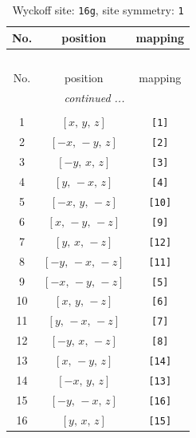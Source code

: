 \documentclass[fleqn,8pt]{jsarticle}
\begin{document}
\renewcommand{\arraystretch}{1.2}
\begin{longtable}{ccc}
\caption{Wyckoff site: {\tt 16g}, site symmetry: {\tt 1}}
 \\
 \hline \hline
No. & position & mapping \\ \hline \endfirsthead

\multicolumn{2}{l}{\tablename\ \thetable{}} \\
 \hline \hline
No. & position & mapping \\ \hline \endhead

 \hline \hline
\multicolumn{2}{r}{\footnotesize\it continued ...} \\ \endfoot

 \hline \hline
\multicolumn{2}{r}{} \\ \endlastfoot

1 & $\left[ x,\, y,\, z \right]$ & {\tt [1]} \\ \hline
2 & $\left[ - x,\, - y,\, z \right]$ & {\tt [2]} \\ \hline
3 & $\left[ - y,\, x,\, z \right]$ & {\tt [3]} \\ \hline
4 & $\left[ y,\, - x,\, z \right]$ & {\tt [4]} \\ \hline
5 & $\left[ - x,\, y,\, - z \right]$ & {\tt [10]} \\ \hline
6 & $\left[ x,\, - y,\, - z \right]$ & {\tt [9]} \\ \hline
7 & $\left[ y,\, x,\, - z \right]$ & {\tt [12]} \\ \hline
8 & $\left[ - y,\, - x,\, - z \right]$ & {\tt [11]} \\ \hline
9 & $\left[ - x,\, - y,\, - z \right]$ & {\tt [5]} \\ \hline
10 & $\left[ x,\, y,\, - z \right]$ & {\tt [6]} \\ \hline
11 & $\left[ y,\, - x,\, - z \right]$ & {\tt [7]} \\ \hline
12 & $\left[ - y,\, x,\, - z \right]$ & {\tt [8]} \\ \hline
13 & $\left[ x,\, - y,\, z \right]$ & {\tt [14]} \\ \hline
14 & $\left[ - x,\, y,\, z \right]$ & {\tt [13]} \\ \hline
15 & $\left[ - y,\, - x,\, z \right]$ & {\tt [16]} \\ \hline
16 & $\left[ y,\, x,\, z \right]$ & {\tt [15]} \\
\end{longtable}
\end{document}
